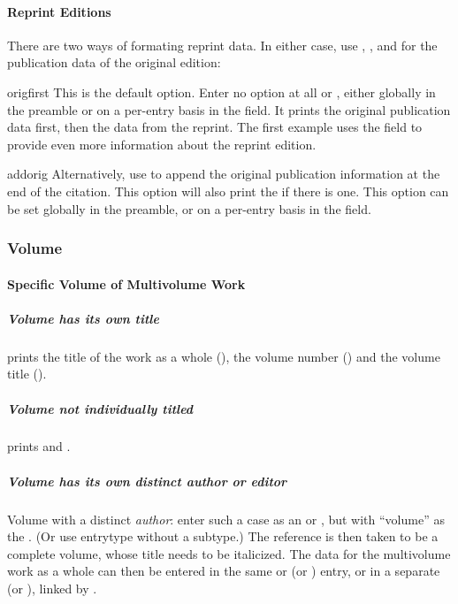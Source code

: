 \documentclass{ltxdockit}[2010/02/12]
\begin{document}
\paragraph{Reprint Editions}
There are two ways of formating reprint data. In either case, use , , and  for the publication data of the original edition: 

\begin{valuelist}
\item[origfirst]
This is the default option. Enter no option at all or , either globally in the preamble or on a per-entry basis in the  field. It prints the original publication data first, then the data from the reprint. The first example uses the  field to provide even more information about the reprint edition.\autocites[][]{225,257}

\item[addorig] Alternatively, use  to append the original publication information at the end of the citation. This option will also print the  if there is one.\autocites{257addorig,schacter2001forgotten-ideas} This option can be set globally in the preamble, or on a per-entry basis in the  field.

\end{valuelist}

\subsubsection{Volume}

\paragraph{Specific Volume of Multivolume Work}
\subparagraph{Volume has its own title}
 prints the title of the work as a whole (), the volume number () and the volume title ().\autocites[][]{twain:1884,Tax:1960ii}

\subparagraph{Volume not individually titled}
 prints  and .\autocites[][]{2548i}

\subparagraph{Volume has its own distinct author or editor}\label{multivolumeeditors}

Volume with a distinct \emph{author}: enter such a case as an  or , but with ``volume'' as the . (Or use entrytype  without a subtype.) The reference is then taken to be a complete volume, whose title needs to be italicized.  The data for the multivolume work as a whole can then be entered in the same  or  (or ) entry,\autocites[][]{darwin:1839} or in a separate  (or ), linked by .\autocites[][]{darwin1839journal-and-rem}
\end{document}
